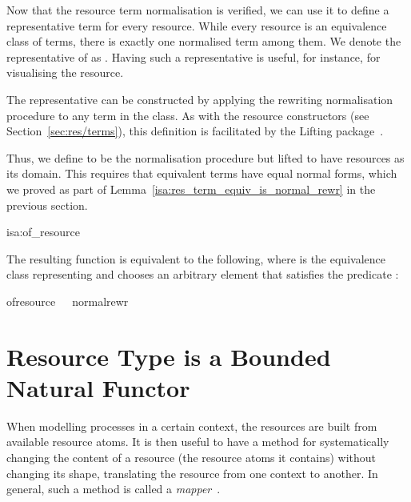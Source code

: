 \documentclass[class=smolathesis,crop=false]{standalone}
\begin{document}
Now that the resource term normalisation is verified, we can use it to define a representative term for every resource.
While every resource is an equivalence class of terms, there is exactly one normalised term among them.
We denote the representative of  as .
Having such a representative is useful, for instance, for visualising the resource.

The representative can be constructed by applying the rewriting normalisation procedure to any term in the class.
As with the resource constructors (see Section~\ref{sec:res/terms}), this definition is facilitated by the Lifting package~\cite{huffman_kuncar-2013}.

Thus, we define  to be the normalisation procedure but lifted to have resources as its domain.
This requires that equivalent terms have equal normal forms, which we proved as part of Lemma~\ref{isa:res_term_equiv_is_normal_rewr} in the previous section.
\begin{isadef}{isa:of_resource}
  
\end{isadef}

The resulting function is equivalent to the following, where  is the equivalence class representing  and  chooses an arbitrary element that satisfies the predicate :
\begin{isabelle}
\centering
  of{\isacharunderscore}resource\ \ \isacharequal\ normal{\isacharunderscore}rewr\ 
\end{isabelle}

\section{Resource Type is a Bounded Natural Functor}
\label{sec:res/bnf}

When modelling processes in a certain context, the resources are built from available resource atoms.
It is then useful to have a method for systematically changing the content of a resource (the resource atoms it contains) without changing its shape, translating the resource from one context to another.
In general, such a method is called a \emph{mapper}~\cite{fuerer_et_al-2020}.
\end{document}
